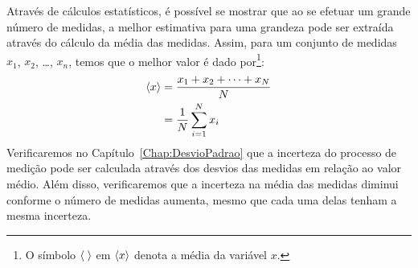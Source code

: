 \begin{description}
Através de cálculos estatísticos, é possível se mostrar que ao se efetuar um grande número de medidas, a melhor estimativa para uma grandeza pode ser extraída através do cálculo da média das medidas. Assim, para um conjunto de medidas $x_1$, $x_2$, \dots, $x_n$, temos que o melhor valor é dado por\footnote{O símbolo $\left\langle{\;}\right\rangle$ em $\left\langle{x}\right\rangle$ denota a média da variável $x$.}:
\begin{align}
	\left\langle{x}\right\rangle &= \frac{x_1 + x_2 + \dots + x_N}{N} \\
		&= \frac{1}{N}\sum_{i=1}^{N} x_i
\end{align}
%
Verificaremos no Capítulo~\ref{Chap:DesvioPadrao} que a incerteza do processo de medição pode ser calculada através dos desvios das medidas em relação ao valor médio. Além disso, verificaremos que a incerteza na média das medidas diminui conforme o número de medidas aumenta, mesmo que cada uma delas tenham a mesma incerteza.





\end{description}
